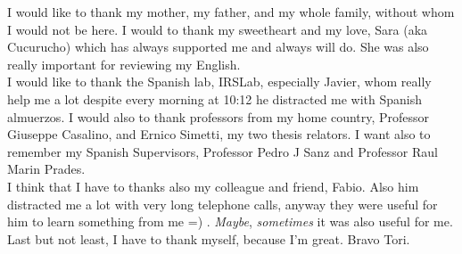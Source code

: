 

\begin{acknowledgements}

I would like to thank my mother, my father, and my whole family, without whom I would not be here. I would to thank my sweetheart and my love, Sara (aka Cucurucho) which has always supported me and always will do. She was also really important for reviewing my English.\\
I would like to thank the Spanish lab, IRSLab, especially Javier, whom really help me a lot despite every morning at 10:12 he distracted me with Spanish almuerzos. I would also to thank professors from my home country, Professor Giuseppe Casalino, and Ernico Simetti, my two thesis relators. I want also to remember my Spanish Supervisors, Professor Pedro J Sanz and Professor Raul Marin Prades.\\
I think that I have to thanks also my colleague and friend, Fabio. Also him distracted me a lot with very long telephone calls, anyway they were useful for him to learn something from me =) . \textit{Maybe}, \textit{sometimes} it was also useful for me.\\
Last but not least, I have to thank myself, because I'm great. Bravo Tori.


\end{acknowledgements}
